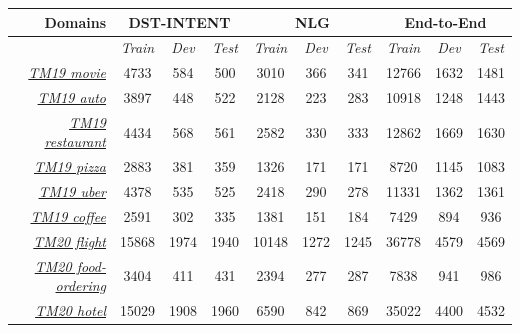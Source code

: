 \documentclass[11pt,a4paper]{article}
\begin{document}
\begin{table}[t]
\begin{tabular}{r|ccc|ccc|ccc}
\hline
\multicolumn{1}{r}{\textbf{Domains}} & \multicolumn{3}{c}{\textbf{DST-INTENT}}       & \multicolumn{3}{c}{\textbf{NLG}}              & \multicolumn{3}{c}{\textbf{End-to-End}}       \\ \hline
\multicolumn{1}{l}{}                 & \textit{Train} & \textit{Dev} & \textit{Test} & \textit{Train} & \textit{Dev} & \textit{Test} & \textit{Train} & \textit{Dev} & \textit{Test} \\ \hline
{\ul \textit{TM19 movie}}            & 4733           & 584          & 500           & 3010           & 366          & 341           & 12766          & 1632         & 1481          \\
{\ul \textit{TM19 auto}}             & 3897           & 448          & 522           & 2128           & 223          & 283           & 10918          & 1248         & 1443          \\
{\ul \textit{TM19 restaurant}}       & 4434           & 568          & 561           & 2582           & 330          & 333           & 12862          & 1669         & 1630          \\
{\ul \textit{TM19 pizza}}            & 2883           & 381          & 359           & 1326           & 171          & 171           & 8720           & 1145         & 1083          \\
{\ul \textit{TM19 uber}}             & 4378           & 535          & 525           & 2418           & 290          & 278           & 11331          & 1362         & 1361          \\
{\ul \textit{TM19 coffee}}           & 2591           & 302          & 335           & 1381           & 151          & 184           & 7429           & 894          & 936           \\
{\ul \textit{TM20 flight}}           & 15868          & 1974         & 1940          & 10148          & 1272         & 1245          & 36778          & 4579         & 4569          \\
{\ul \textit{TM20 food-ordering}}    & 3404           & 411          & 431           & 2394           & 277          & 287           & 7838           & 941          & 986           \\
{\ul \textit{TM20 hotel}}            & 15029          & 1908         & 1960          & 6590           & 842          & 869           & 35022          & 4400         & 4532          \\

\end{tabular}
\end{table}
\end{document}
